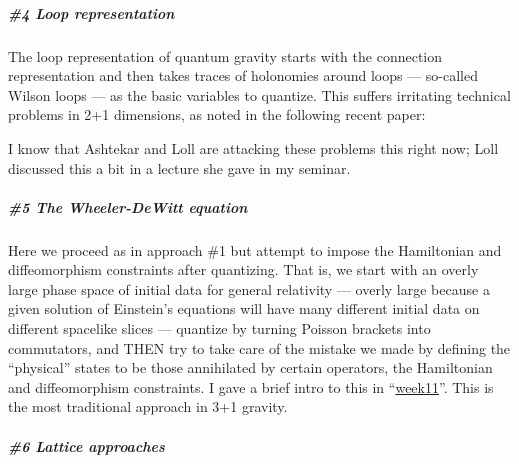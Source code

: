 \documentclass{article}
\def\tightlist{}
\renewcommand{\texttt}[1]{%
  \begingroup
  \ttfamily
  \begingroup\lccode`~=`/\lowercase{\endgroup\def~}{/\discretionary{}{}{}}%
  \begingroup\lccode`~=`[\lowercase{\endgroup\def~}{[\discretionary{}{}{}}%
  \begingroup\lccode`~=`.\lowercase{\endgroup\def~}{.\discretionary{}{}{}}%
  \catcode`/=\active\catcode`[=\active\catcode`.=\active
  \scantokens{#1\noexpand}%
  \endgroup
}
\begin{document}
\hypertarget{loop-representation}{%
\subparagraph{\#4 Loop representation}\label{loop-representation}}

The loop representation of quantum gravity starts with the connection
representation and then takes traces of holonomies around loops ---
so-called Wilson loops --- as the basic variables to quantize. This
suffers irritating technical problems in 2+1 dimensions, as noted in the
following recent paper:


I know that Ashtekar and Loll are attacking these problems this right
now; Loll discussed this a bit in a lecture she gave in my seminar.

\hypertarget{the-wheeler-dewitt-equation}{%
\subparagraph{\#5 The Wheeler-DeWitt
equation}\label{the-wheeler-dewitt-equation}}

Here we proceed as in approach \#1 but attempt to impose the Hamiltonian
and diffeomorphism constraints after quantizing. That is, we start with
an overly large phase space of initial data for general relativity ---
overly large because a given solution of Einstein's equations will have
many different initial data on different spacelike slices --- quantize
by turning Poisson brackets into commutators, and THEN try to take care
of the mistake we made by defining the ``physical'' states to be those
annihilated by certain operators, the Hamiltonian and diffeomorphism
constraints. I gave a brief intro to this in
``\href{week11.html}{week11}''. This is the most traditional approach in
3+1 gravity.

\hypertarget{lattice-approaches}{%
\subparagraph{\#6 Lattice approaches}\label{lattice-approaches}}
\end{document}
